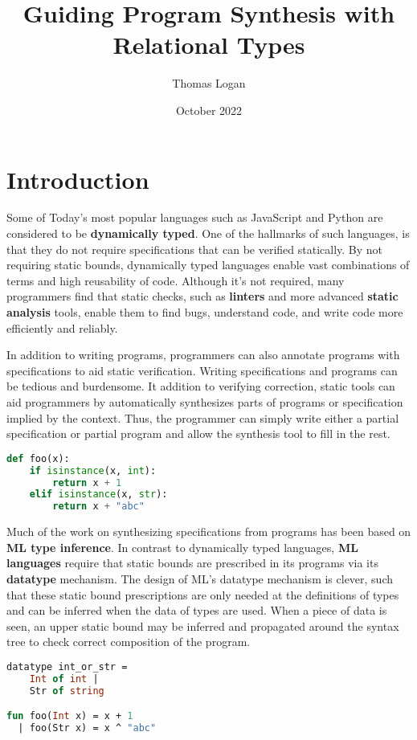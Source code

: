 \documentclass[manuscript]{acmart}
\title{Guiding Program Synthesis with Relational Types}
\author{Thomas Logan}
\date{October 2022}
\theoremstyle{definition}
\begin{document}
\maketitle

\section{Introduction}
Some of Today's most popular languages such as JavaScript and Python are considered to be \textbf{dynamically typed}.
One of the hallmarks of such languages, is that they do not require specifications 
that can be verified statically. By not requiring static bounds, dynamically typed languages
enable vast combinations of terms and high reusability of code. 
Although it's not required, many programmers find that
static checks, such as \textbf{linters} and more advanced \textbf{static analysis} tools, 
enable them to find bugs, understand code, and write code more efficiently and reliably. 

In addition to writing programs, programmers can also annotate programs with specifications to
aid static verification. Writing specifications and programs can be tedious and burdensome.  
It addition to verifying correction, static tools can aid programmers by automatically synthesizes
parts of programs or specification implied by the context. Thus, the programmer can simply write
either a partial specification or partial program and allow the synthesis tool to fill in the rest.   

\begin{lstlisting}[language=Python]
def foo(x):
    if isinstance(x, int):
        return x + 1 
    elif isinstance(x, str): 
        return x + "abc"
\end{lstlisting}

Much of the work on synthesizing specifications from programs has been based on \textbf{ML type inference}.
In contrast to dynamically typed languages, \textbf{ML languages} require that static bounds are prescribed 
in its programs via its \textbf{datatype} mechanism. The design of ML's datatype mechanism is clever, 
such that these static bound prescriptions are only needed at the definitions of types and can be 
inferred when the data of types are used. When a piece of data is seen, an upper static bound 
may be inferred and propagated around the syntax tree to check correct composition of the program.

\begin{lstlisting}[language=ML]
datatype int_or_str = 
    Int of int | 
    Str of string

fun foo(Int x) = x + 1
  | foo(Str x) = x ^ "abc"
\end{lstlisting}
\end{document}
